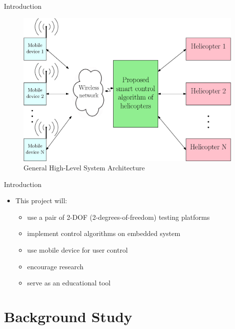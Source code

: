 \documentclass{beamer}
\begin{document}
\begin{frame}{Introduction}{}
\begin{figure}
  \centering
  \includegraphics[scale=0.31]{figs/ipe/ProblemStatementImageWhite}
  \caption{General High-Level System Architecture}
  \label{fig:ProblemStatementImage}
\end{figure}
\end{frame}

\begin{frame}{Introduction}{}
        \begin{itemize}
        \item This project will:
            \begin{itemize}
                \item use a pair of 2-DOF (2-degrees-of-freedom) testing platforms
                \item implement control algorithms on embedded system
                \item use mobile device for user control
                \item encourage research
                \item serve as an educational tool
            \end{itemize}
        \end{itemize}
\end{frame}


\section{Background Study}
\end{document}

